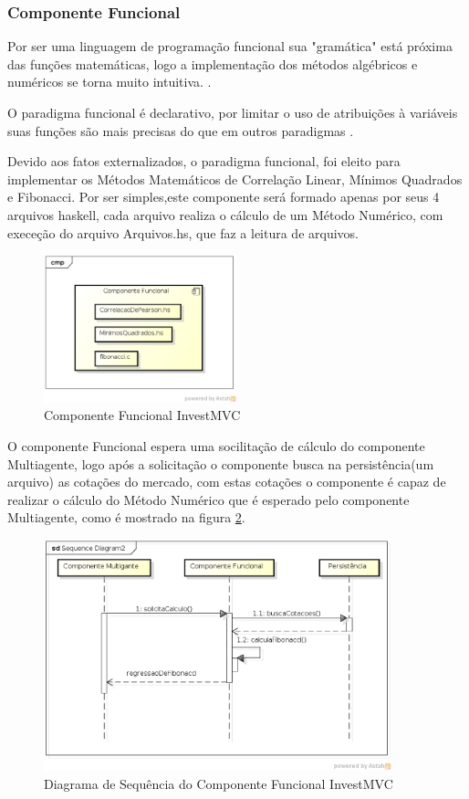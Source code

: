 \subsubsection{Componente Funcional}
Por ser uma linguagem de programação funcional sua "gramática" está próxima das funções matemáticas, logo a implementação dos métodos algébricos e numéricos se torna muito intuitiva. \cite{hoogle2013}.

O paradigma funcional é declarativo, por limitar o uso de atribuições à variáveis suas funções são mais precisas do que em outros paradigmas \cite{piponi2006}.

Devido aos fatos externalizados, o paradigma funcional, foi eleito para implementar os Métodos Matemáticos de Correlação Linear, Mínimos Quadrados e Fibonacci. Por ser simples,este componente será formado apenas por seus 4 arquivos haskell, cada arquivo realiza o cálculo de um Método Numérico, com execeção do arquivo  Arquivos.hs, que faz a leitura de arquivos.

\begin{figure}[H]
\centering
\includegraphics[width=0.5\textwidth]{figuras/componenteFuncional}
\caption{Componente Funcional InvestMVC} 
\label{componenteFuncional}
\end{figure}

O componente Funcional espera uma socilitação de cálculo do componente Multiagente, logo após a solicitação o componente busca na persistência(um arquivo) as cotações do mercado, com estas cotações o componente é capaz de realizar o cálculo do Método Numérico que é esperado pelo componente Multiagente, como é mostrado na figura \ref{sequenciaFuncional}.

\begin{figure}[H]
\centering
\includegraphics[width=0.9\textwidth]{figuras/sequenciaFuncional}
\caption{Diagrama de Sequência do Componente Funcional InvestMVC} 
\label{sequenciaFuncional}
\end{figure}

